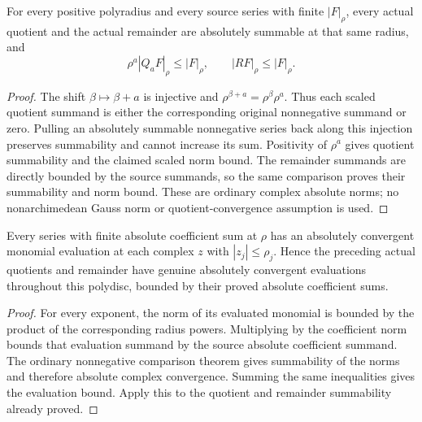 \begin{theorem}
\label{hir:actual-monomial-owner-absolute-bounds}
\leanok
For every positive polyradius and every source series with finite $|F|_\rho$, every actual quotient and the actual remainder are absolutely summable at that same radius, and
\[
 \rho^a|Q_aF|_\rho\le |F|_\rho,
 \qquad |RF|_\rho\le |F|_\rho.
\]
\end{theorem}
\begin{proof}
The shift $\beta\mapsto\beta+a$ is injective and $\rho^{\beta+a}=\rho^\beta\rho^a$. Thus each scaled quotient summand is either the corresponding original nonnegative summand or zero. Pulling an absolutely summable nonnegative series back along this injection preserves summability and cannot increase its sum. Positivity of $\rho^a$ gives quotient summability and the claimed scaled norm bound. The remainder summands are directly bounded by the source summands, so the same comparison proves their summability and norm bound. These are ordinary complex absolute norms; no nonarchimedean Gauss norm or quotient-convergence assumption is used.
\end{proof}

\begin{theorem}
\label{hir:actual-monomial-owner-polydisc-convergence}
\leanok
Every series with finite absolute coefficient sum at $\rho$ has an absolutely convergent monomial evaluation at each complex $z$ with $|z_j|\le\rho_j$. Hence the preceding actual quotients and remainder have genuine absolutely convergent evaluations throughout this polydisc, bounded by their proved absolute coefficient sums.
\end{theorem}
\begin{proof}
For every exponent, the norm of its evaluated monomial is bounded by the product of the corresponding radius powers. Multiplying by the coefficient norm bounds that evaluation summand by the source absolute coefficient summand. The ordinary nonnegative comparison theorem gives summability of the norms and therefore absolute complex convergence. Summing the same inequalities gives the evaluation bound. Apply this to the quotient and remainder summability already proved.
\end{proof}


